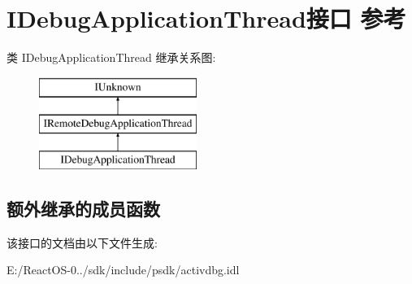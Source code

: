 \hypertarget{interface_i_debug_application_thread}{}\section{I\+Debug\+Application\+Thread接口 参考}
\label{interface_i_debug_application_thread}
类 I\+Debug\+Application\+Thread 继承关系图\+:\begin{figure}[H]
\begin{center}
\leavevmode
\includegraphics[height=3.000000cm]{interface_i_debug_application_thread}
\end{center}
\end{figure}
\subsection*{额外继承的成员函数}


该接口的文档由以下文件生成\+:\begin{DoxyCompactItemize}
\item 
E\+:/\+React\+O\+S-\/0../sdk/include/psdk/activdbg.\+idl\end{DoxyCompactItemize}

